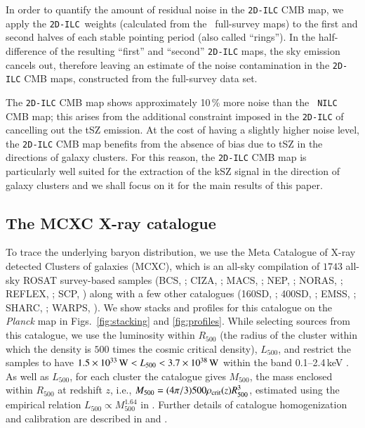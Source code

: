 \documentclass[traditabstract, longauth]{aa}
\newcommand{\twodilc}{{\tt 2D-ILC}}
\newcommand{\1}{\'\i }
\begin{document}
In order to quantify the amount of residual noise in the {\tt 2D-ILC} CMB
map, we apply the \twodilc\ weights (calculated from the \Planck\
full-survey maps) to the first and second halves of each stable pointing period
(also called ``rings''). In the half-difference of the resulting ``first'' and
``second'' {\tt 2D-ILC} maps, the sky emission cancels out, therefore leaving
an estimate of the noise contamination in the {\tt 2D-ILC} CMB maps,
constructed from the full-survey data set.

The {\tt 2D-ILC} CMB map shows approximately 10\,\% more noise than the {\tt
NILC} CMB map; this arises from the additional
constraint imposed in the {\tt 2D-ILC} of cancelling out the tSZ emission. At
the cost of having a slightly higher noise level, the {\tt 2D-ILC} CMB map
benefits from the absence of bias due to tSZ in the directions of galaxy
clusters. For this reason, the {\tt 2D-ILC} CMB map is particularly well
suited for the extraction of the kSZ signal in the direction of galaxy
clusters and we shall focus on it for the main results of this paper.


\subsection{The MCXC X-ray catalogue}
\label{sec:MCXC}

To trace the underlying baryon distribution, we use the Meta Catalogue of X-ray
detected Clusters of galaxies (MCXC), which is an all-sky
compilation of $1743$ all-sky
ROSAT survey-based samples (BCS, \citealt{eb98,eb00}; CIZA, \citealt{eb10,koc};
MACS, \citealt{eb07}; NEP, \citealt{Henry06}; NORAS, \citealt{boh00}; REFLEX,
\citealt{boh04}; SCP, \citealt{cru}) along with a few other catalogues (160SD,
\citealt{mul}; 400SD, \citealt{bure}; EMSS, \citealt{gio,Henry04}; SHARC,
\citealt{rom,burk}; WARPS, \citealt{per,hor}). We show stacks and profiles
for this catalogue on the {\it Planck} map in Figs.~\ref{fig:stacking} and \ref{fig:profiles}.
While selecting sources from this catalogue, we use the luminosity within
$R_{500}$ (the radius of the cluster within which the density is $500$ times
the cosmic critical density), $L_{500}$, and restrict the samples to have
$1.5 \times 10^{33}\,{\rm W} < L_{500}< 3.7 \times 10^{38}\,{\rm W}$ within the
band 0.1--2.4\,keV \citep[see][]{pif}. As well as $L_{500}$, for each
cluster the catalogue gives $M_{500}$, the mass enclosed within $R_{500}$ at
redshift $z$, i.e., $M_{500}=(4\pi/3)500 \rho_{\rm crit}(z)R^{3}_{500}$,
estimated using the empirical relation $L_{500} \propto M_{500}^{1.64}$
in \citet{Arnaud10}.  Further details of catalogue homogenization and
calibration are described in \cite{pif} and \cite{planck2013-XIII}.
\end{document}
